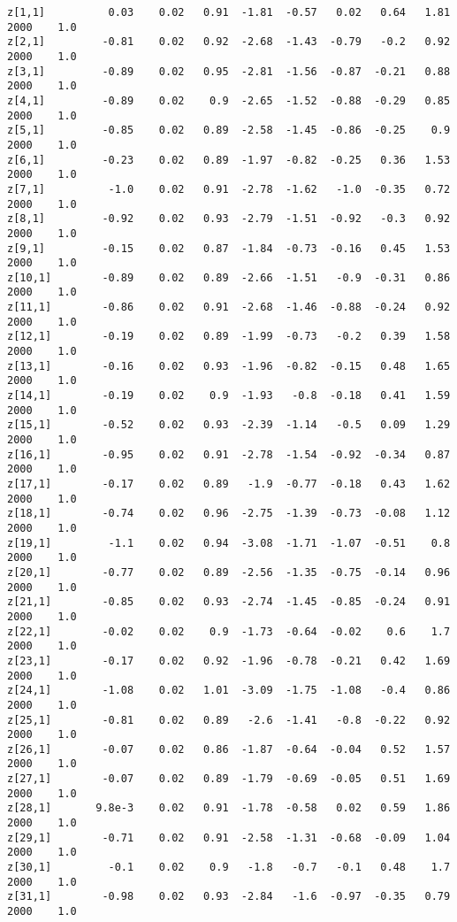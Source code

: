 \documentclass[11pt]{article}
\begin{document}
\begin{Verbatim}[commandchars=\\\{\}]
z[1,1]          0.03    0.02   0.91  -1.81  -0.57   0.02   0.64   1.81   2000    1.0
z[2,1]         -0.81    0.02   0.92  -2.68  -1.43  -0.79   -0.2   0.92   2000    1.0
z[3,1]         -0.89    0.02   0.95  -2.81  -1.56  -0.87  -0.21   0.88   2000    1.0
z[4,1]         -0.89    0.02    0.9  -2.65  -1.52  -0.88  -0.29   0.85   2000    1.0
z[5,1]         -0.85    0.02   0.89  -2.58  -1.45  -0.86  -0.25    0.9   2000    1.0
z[6,1]         -0.23    0.02   0.89  -1.97  -0.82  -0.25   0.36   1.53   2000    1.0
z[7,1]          -1.0    0.02   0.91  -2.78  -1.62   -1.0  -0.35   0.72   2000    1.0
z[8,1]         -0.92    0.02   0.93  -2.79  -1.51  -0.92   -0.3   0.92   2000    1.0
z[9,1]         -0.15    0.02   0.87  -1.84  -0.73  -0.16   0.45   1.53   2000    1.0
z[10,1]        -0.89    0.02   0.89  -2.66  -1.51   -0.9  -0.31   0.86   2000    1.0
z[11,1]        -0.86    0.02   0.91  -2.68  -1.46  -0.88  -0.24   0.92   2000    1.0
z[12,1]        -0.19    0.02   0.89  -1.99  -0.73   -0.2   0.39   1.58   2000    1.0
z[13,1]        -0.16    0.02   0.93  -1.96  -0.82  -0.15   0.48   1.65   2000    1.0
z[14,1]        -0.19    0.02    0.9  -1.93   -0.8  -0.18   0.41   1.59   2000    1.0
z[15,1]        -0.52    0.02   0.93  -2.39  -1.14   -0.5   0.09   1.29   2000    1.0
z[16,1]        -0.95    0.02   0.91  -2.78  -1.54  -0.92  -0.34   0.87   2000    1.0
z[17,1]        -0.17    0.02   0.89   -1.9  -0.77  -0.18   0.43   1.62   2000    1.0
z[18,1]        -0.74    0.02   0.96  -2.75  -1.39  -0.73  -0.08   1.12   2000    1.0
z[19,1]         -1.1    0.02   0.94  -3.08  -1.71  -1.07  -0.51    0.8   2000    1.0
z[20,1]        -0.77    0.02   0.89  -2.56  -1.35  -0.75  -0.14   0.96   2000    1.0
z[21,1]        -0.85    0.02   0.93  -2.74  -1.45  -0.85  -0.24   0.91   2000    1.0
z[22,1]        -0.02    0.02    0.9  -1.73  -0.64  -0.02    0.6    1.7   2000    1.0
z[23,1]        -0.17    0.02   0.92  -1.96  -0.78  -0.21   0.42   1.69   2000    1.0
z[24,1]        -1.08    0.02   1.01  -3.09  -1.75  -1.08   -0.4   0.86   2000    1.0
z[25,1]        -0.81    0.02   0.89   -2.6  -1.41   -0.8  -0.22   0.92   2000    1.0
z[26,1]        -0.07    0.02   0.86  -1.87  -0.64  -0.04   0.52   1.57   2000    1.0
z[27,1]        -0.07    0.02   0.89  -1.79  -0.69  -0.05   0.51   1.69   2000    1.0
z[28,1]       9.8e-3    0.02   0.91  -1.78  -0.58   0.02   0.59   1.86   2000    1.0
z[29,1]        -0.71    0.02   0.91  -2.58  -1.31  -0.68  -0.09   1.04   2000    1.0
z[30,1]         -0.1    0.02    0.9   -1.8   -0.7   -0.1   0.48    1.7   2000    1.0
z[31,1]        -0.98    0.02   0.93  -2.84   -1.6  -0.97  -0.35   0.79   2000    1.0

\end{Verbatim}
\end{document}
